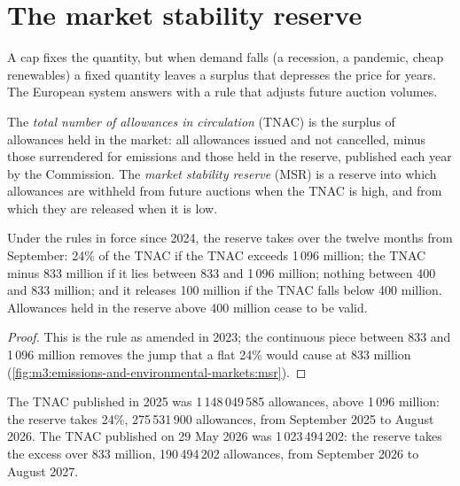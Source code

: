 \section{The market stability reserve}

A cap fixes the quantity, but when demand falls (a recession, a pandemic, cheap renewables) a
fixed quantity leaves a surplus that depresses the price for years. The European system
answers with a rule that adjusts future auction volumes.

\begin{definition}\label{def:m3:emissions-and-environmental-markets:msr}
The \emph{total number of allowances in circulation}
(TNAC) is the surplus of allowances held in the market: all allowances issued and not
cancelled, minus those surrendered for emissions and those held in the reserve, published each
year by the Commission. The \emph{market stability reserve}
(MSR) is a reserve into which allowances are withheld from future auctions when the TNAC is
high, and from which they are released when it is low.
\end{definition}

\begin{proposition}\label{prop:m3:emissions-and-environmental-markets:msr}
Under the rules in force since 2024, the reserve takes over the twelve months from September:
24\% of the TNAC if the TNAC exceeds 1\,096 million; the TNAC minus 833 million if it lies
between 833 and 1\,096 million; nothing between 400 and 833 million; and it releases 100
million if the TNAC falls below 400 million. Allowances held in the reserve above 400 million
cease to be valid.
\end{proposition}

\begin{proof}
This is the rule as amended in 2023; the continuous piece between 833 and 1\,096 million
removes the jump that a flat 24\% would cause at 833 million
(\cref{fig:m3:emissions-and-environmental-markets:msr}).
\end{proof}

\begin{example}\label{ex:m3:emissions-and-environmental-markets:msr}
The TNAC published in 2025 was 1\,148\,049\,585 allowances, above 1\,096 million: the
reserve takes 24\%, 275\,531\,900 allowances, from September 2025 to August 2026. The TNAC
published on 29 May 2026 was 1\,023\,494\,202: the reserve takes the excess over 833 million,
190\,494\,202 allowances, from September 2026 to August 2027.
\end{example}

